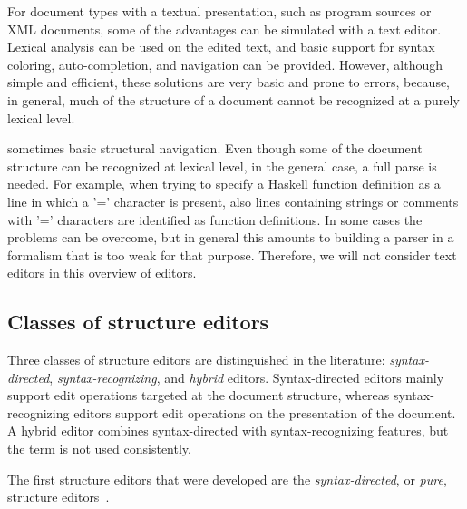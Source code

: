 For document types with a textual presentation, such as program sources or XML documents, some of the advantages can be simulated with a text editor. Lexical analysis can be used on the edited text, and basic support for syntax coloring, auto-completion, and navigation can be provided. However, although simple and efficient, these solutions are  very basic and prone to errors, because, in general, much of the structure of a document cannot be recognized at a purely lexical level.

\bc
sometimes basic structural navigation.  Even though some of the document structure can be recognized at lexical level, in the general case, a full parse is needed. For example, when trying to specify a Haskell function definition as a line in which a '=' character is present, also lines containing strings or comments with '=' characters are identified as function definitions. In some cases the problems can be overcome, but in general this amounts to building a parser in a formalism that is too weak for that purpose. Therefore, we will not consider text editors in this overview of editors.
\ec






%								
\subsection{Classes of structure editors} \label{sect:classes}

Three classes of structure editors are distinguished in the literature: {\em syntax-directed}, {\em syntax-recognizing}, and {\em hybrid} editors. Syntax-directed editors mainly support edit operations targeted at the document structure, whereas syntax-recognizing editors support edit operations on the presentation of the document. A hybrid editor combines syntax-directed with syntax-recognizing features, but the term is not used consistently. 


The first structure editors that were developed are the {\em syntax-directed}, or {\em pure}, structure editors~\cite{reps84synGen,Bahlke86PSG,magnusson90orm}.

